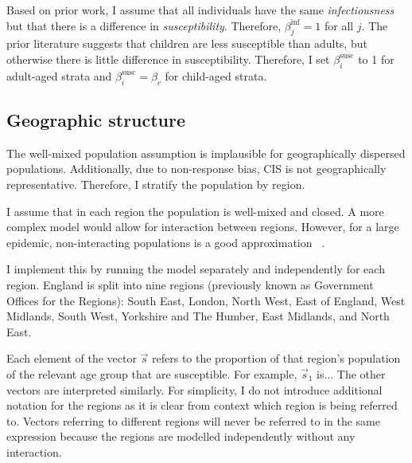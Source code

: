 \documentclass[thesis.tex]{subfiles}
\begin{document}

Based on prior work, I assume that all individuals have the same \emph{infectiousness} but that there is a difference in \emph{susceptibility}.
Therefore, $\beta^\text{inf}_{j} = 1$ for all $j$.
The prior literature suggests that children are less susceptible than adults, but otherwise there is little difference in susceptibility.
Therefore, I set $\beta^\text{susc}_i$ to 1 for adult-aged strata and $\beta^\text{susc}_i = \beta_c$ for child-aged strata.

\subsection{Geographic structure} \label{SEIR:sec:geography}

The well-mixed population assumption is implausible for geographically dispersed populations.
Additionally, due to non-response bias, CIS is not geographically representative.
Therefore, I stratify the population by region.

I assume that in each region the population is well-mixed and closed.
A more complex model would allow for interaction between regions.
However, for a large epidemic, non-interacting populations is a good approximation ~\autocite{birrellRealtimea}.

I implement this by running the model separately and independently for each region.
England is split into nine regions (previously known as Government Offices for the Regions): South East, London, North West, East of England, West Midlands, South West, Yorkshire and The Humber, East Midlands, and North East.

Each element of the vector $\vec{s}$ refers to the proportion of that region's population of the relevant age group that are susceptible.
For example, $\vec{s}_1$ is...
The other vectors are interpreted similarly.
For simplicity, I do not introduce additional notation for the regions as it is clear from context which region is being referred to.
Vectors referring to different regions will never be referred to in the same expression because the regions are modelled independently without any interaction.
\end{document}

